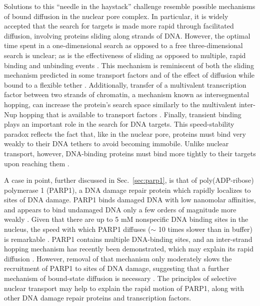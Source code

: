 Solutions to this ``needle in the haystack'' challenge resemble possible mechanisms of bound diffusion in the nuclear pore complex.  In particular, it is widely accepted that the search for targets is made more rapid through facilitated diffusion, involving proteins sliding along strands of DNA.  However, the optimal time spent in a one-dimensional search as opposed to a free three-dimensional search is unclear; as is the effectiveness of sliding as opposed to multiple, rapid binding and unbinding events \cite{halford09}.  This mechanism is reminiscent of both the sliding mechanism predicted in some transport factors and of the effect of diffusion while bound to a flexible tether \cite{raveh16}.  Additionally, transfer of a multivalent transcription factor between two strands of chromatin, a mechanism known as intersegmental hopping, can increase the protein's search space similarly to the multivalent inter-Nup hopping that is available to transport factors \cite{doucleff08,halford04a}.  Finally, transient binding plays an important role in the search for DNA targets.  This speed-stability paradox reflects the fact that, like in the nuclear pore, proteins must bind very weakly to their DNA tethers to avoid becoming immobile.  Unlike nuclear transport, however, DNA-binding proteins must bind more tightly to their targets upon reaching them \cite{iwahara13,zandarashvili15}.

A case in point, further discussed in Sec.~\ref{sec:parp1}, is that of poly(ADP-ribose) polymerase 1 (PARP1), a DNA damage repair protein which rapidly localizes to sites of DNA damage.  PARP1 binds damaged DNA with low nanomolar affinities, and appears to bind undamaged DNA only a few orders of magnitude more weakly \cite{sukhanova16}.  Given that there are up to 5 mM nonspecific DNA binding sites in the nucleus, the speed with which PARP1 diffuses ($\sim$ 10 times slower than in buffer) is remarkable \cite{iwahara13}.  PARP1 contains multiple DNA-binding sites, and an inter-strand hopping mechanism has recently been demonstrated, which may explain its rapid diffusion \cite{rudolph18}.  However, removal of that mechanism only moderately slows the recruitment of PARP1 to sites of DNA damage, suggesting that a further mechanism of bound-state diffusion is necessary \cite{mahadevan18}.  The principles of selective nuclear transport may help to explain the rapid motion of PARP1, along with other DNA damage repair proteins and transcription factors.


